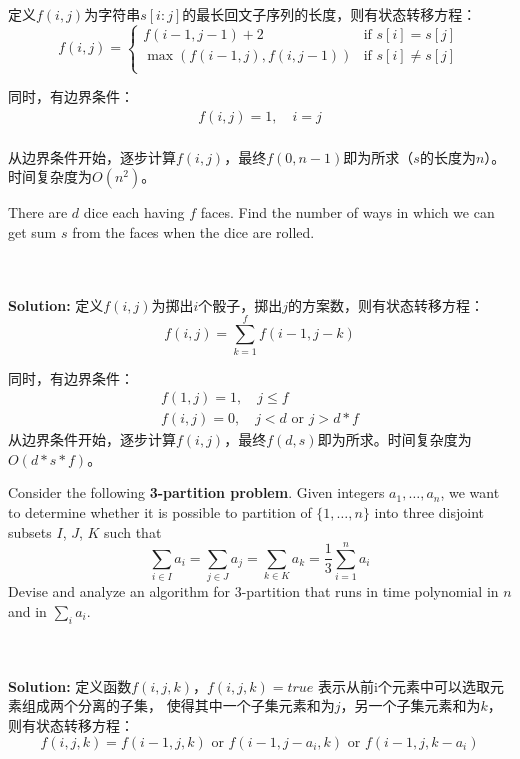 \documentclass{article}
\newcounter{exercise}
\newcommand{\<}{
    \langle}
\renewcommand{\>}{
    \rangle}
\begin{document}
{定义$f(i, j)$为字符串$s[i:j]$的最长回文子序列的长度，则有状态转移方程：
\begin{equation*}
f(i, j) = \begin{cases}
f(i-1, j-1) + 2 & \text{if } s[i] = s[j] \\
\max(f(i-1, j), f(i, j-1)) & \text{if } s[i] \neq s[j] \\
\end{cases}
\end{equation*}

\noindent 同时，有边界条件：
\begin{gather*}
    f(i, j) = 1, \quad i = j \\
\end{gather*}

从边界条件开始，逐步计算$f(i, j)$，最终$f(0, n-1)$即为所求（$s$的长度为$n$）。时间复杂度为$O(n^2)$。

\begin{exercise}
There are $d$ dice each having $f$ faces. Find the number of ways in which we can get sum $s$ from the faces when the dice are rolled.
\end{exercise}
\\\\
\noindent\textbf{Solution:}
定义$f(i, j)$为掷出$i$个骰子，掷出$j$的方案数，则有状态转移方程：
\begin{equation*}
    f(i, j) = \sum_{k=1}^{f} f(i-1, j-k)
\end{equation*}

\noindent 同时，有边界条件：
\begin{gather*}
    f(1, j) = 1, \quad j \leq f \\
    f(i, j) = 0, \quad j < d \text{ or } j > d*f 
\end{gather*}
从边界条件开始，逐步计算$f(i, j)$，最终$f(d, s)$即为所求。时间复杂度为$O(d*s*f)$。


\begin{exercise}
Consider the following \textbf{3-partition problem}. Given integers $a_1,\ldots,a_n$, we want to determine whether it is possible to partition of $\{1,\ldots, n\}$ into three disjoint subsets $I$, $J$, $K$ such that
$$\sum_{i\in I} a_i =\sum_{j\in J} a_j= \sum_{k\in K} a_k =\frac{1}{3} \sum_{i=1}^n a_i$$
Devise and analyze an algorithm for 3-partition that runs in time polynomial in $n$ and in $\sum_i a_i$.
\end{exercise}
\\\\
\noindent\textbf{Solution:}
    定义函数$f(i, j, k)$，$f(i, j, k)=true$ 表示从前i个元素中可以选取元素组成两个分离的子集，
使得其中一个子集元素和为$j$，另一个子集元素和为$k$，则有状态转移方程：
\begin{equation*}
    f(i, j, k) = f(i-1, j, k) \text{ or } f(i-1, j-a_i, k) \text{ or } f(i-1, j, k-a_i)
\end{equation*}

}
\end{document}
